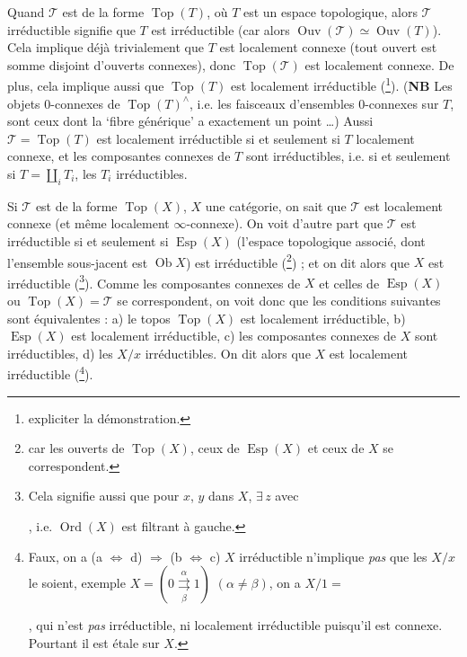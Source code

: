 \documentclass[11pt]{article}
\newcommand{\printedpage}[1]{\marginpar{\footnotesize p.~#1}}
\newcommand{\msp}[1]{\marginpar{\footnotesize [#1]}}
\begin{document}
Quand $\mathcal{T}$ est de la forme $\operatorname{Top}(T)$, où $T$ est un espace topologique, alors $\mathcal{T}$ irréductible signifie que $T$ est irréductible (car alors $\operatorname{Ouv}(\mathcal{T}) \simeq \operatorname{Ouv}(T)$). Cela implique déjà trivialement que $T$ est localement connexe (tout ouvert est somme disjoint d'ouverts connexes), donc $\operatorname{Top}(\mathcal{T})$ est localement connexe. De plus, cela implique aussi que $\operatorname{Top}(T)$ est localement irréductible (\footnote[7]{expliciter la démonstration.}). (\textbf{NB} Les objets 0-connexes %
\msp{page 12}
de $\operatorname{Top}(T)^\wedge$, i.e. les faisceaux d'ensembles 0-connexes sur $T$, sont ceux dont la `fibre générique' a exactement un point \dots) Aussi $\mathcal{T} = \operatorname{Top}(T)$ est localement irréductible si et seulement si $T$ localement connexe, et les composantes connexes de $T$ sont irréductibles, i.e. si et seulement si $T = \coprod_i T_i$, les $T_i$ irréductibles.

Si $\mathcal{T}$ est de la forme $\operatorname{Top}(X)$, $X$ une catégorie, on sait que $\mathcal{T}$ est localement connexe (et même localement $\infty$-connexe). On voit d'autre part que $\mathcal{T}$ est irréductible si et seulement si $\operatorname{Esp}(X)$ (l'espace topologique associé, dont l'ensemble sous-jacent est $\operatorname{Ob} X$) est irréductible (\footnote[8]{car les ouverts de $\operatorname{Top}(X)$, ceux de $\operatorname{Esp}(X)$ et ceux de $X$ se correspondent.}) ; et on dit alors que $X$ est irréductible (\footnote[9]{Cela signifie aussi que pour $x$, $y$ dans $X$, $\exists\, z$ avec , i.e. $\operatorname{Ord}(X)$ est filtrant à gauche.}). Comme les composantes connexes de $X$ et celles de $\operatorname{Esp}(X)$ ou $\operatorname{Top}(X) = \mathcal{T}$ se correspondent, on voit donc que les conditions suivantes sont équivalentes : a) le topos $\operatorname{Top}(X)$ est localement irréductible, b)
\printedpage{8}
$\operatorname{Esp}(X)$ est localement irréductible, c) les composantes connexes de $X$ sont irréductibles, d) les $X/x$ irréductibles. On dit alors que $X$ est localement irréductible (\footnote[10]{Faux, on a (a $\Longleftrightarrow$ d) $\Longrightarrow$ (b $\Longleftrightarrow$ c) $X$ irréductible n'implique \textit{pas} que les $X/x$ le soient, exemple $X = (0 \overset{\alpha}{\underset{\beta}{\rightrightarrows}} 1)$ $(\alpha \neq \beta)$, on a $X/1 =$ , qui n'est \textit{pas} irréductible, ni localement irréductible puisqu'il est connexe. Pourtant il est étale sur $X$.}).
\end{document}
